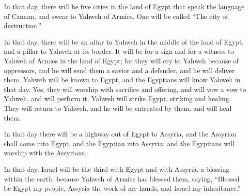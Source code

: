 {In that day, there will be five cities in the land of Egypt that speak the language of Canaan, and swear to Yahweh of Armies. One will be called “The city of destruction.”
\par }{\PP {}In that day, there will be an altar to Yahweh in the middle of the land of Egypt, and a pillar to Yahweh at its border.
It will be for a sign and for a witness to Yahweh of Armies in the land of Egypt; for they will cry to Yahweh because of oppressors, and he will send them a savior and a defender, and he will deliver them.
Yahweh will be known to Egypt, and the Egyptians will know Yahweh in that day. Yes, they will worship with sacrifice and offering, and will vow a vow to Yahweh, and will perform it.
Yahweh will strike Egypt, striking and healing. They will return to Yahweh, and he will be entreated by them, and will heal them.
\par }{\PP {}In that day there will be a highway out of Egypt to Assyria, and the Assyrian shall come into Egypt, and the Egyptian into Assyria; and the Egyptians will worship with the Assyrians.
\par }{\PP {}In that day, Israel will be the third with Egypt and with Assyria, a blessing within the earth;
because Yahweh of Armies has blessed them, saying, “Blessed be Egypt my people, Assyria the work of my hands, and Israel my inheritance.”

\par }
